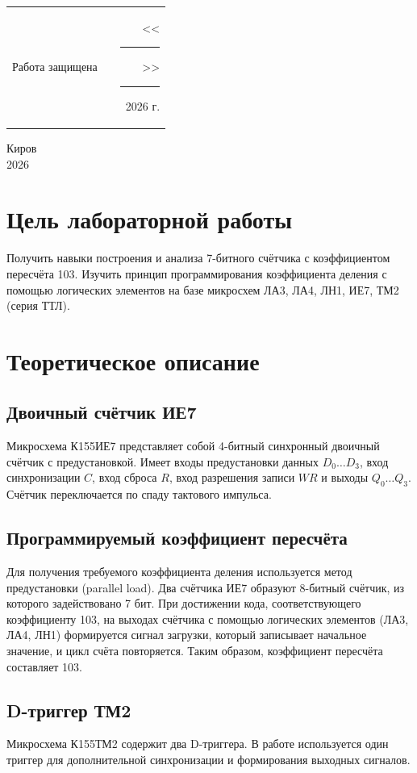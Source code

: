 \documentclass[oneside,a4paper,14pt]{extarticle}
\begin{document}
\noindent
\begin{tabular}{lp{58mm}r}
  Работа защищена &  & \hspace{5mm}<<\rule[-1mm]{5mm}{0.10mm}\/>>\rule[-1mm]{30mm}{0.10mm}\ 2026 г.
\end{tabular}
\vfill

\begin{center}
  Киров\\
  2026
\end{center}

\newpage\thispagestyle{plain}

\section{Цель лабораторной работы}
Получить навыки построения и анализа 7-битного счётчика с коэффициентом пересчёта 103. Изучить принцип программирования коэффициента деления с помощью логических элементов на базе микросхем ЛА3, ЛА4, ЛН1, ИЕ7, ТМ2 (серия ТТЛ).

\section{Теоретическое описание}
\subsection{Двоичный счётчик ИЕ7}
Микросхема К155ИЕ7 представляет собой 4-битный синхронный двоичный счётчик с предустановкой. Имеет входы предустановки данных $D_0\ldots D_3$, вход синхронизации $C$, вход сброса $R$, вход разрешения записи $WR$ и выходы $Q_0\ldots Q_3$. Счётчик переключается по спаду тактового импульса.

\subsection{Программируемый коэффициент пересчёта}
Для получения требуемого коэффициента деления используется метод предустановки (parallel load). Два счётчика ИЕ7 образуют 8-битный счётчик, из которого задействовано 7 бит. При достижении кода, соответствующего коэффициенту 103, на выходах счётчика с помощью логических элементов (ЛА3, ЛА4, ЛН1) формируется сигнал загрузки, который записывает начальное значение, и цикл счёта повторяется. Таким образом, коэффициент пересчёта составляет 103.

\subsection{D-триггер ТМ2}
Микросхема К155ТМ2 содержит два D-триггера. В работе используется один триггер для дополнительной синхронизации и формирования выходных сигналов.
\end{document}
